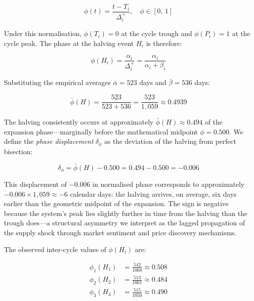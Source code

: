 \begin{equation}
  \phi(t) = \frac{t - T_i}{\Delta^{+}_i}, \quad \phi \in [0,\, 1]
  \label{eq:phase_norm}
\end{equation}

Under this normalisation, $\phi(T_i) = 0$ at the cycle trough and
$\phi(P_i) = 1$ at the cycle peak. The phase at the halving event $H_i$ is
therefore:

\begin{equation}
  \phi(H_i) = \frac{\alpha_i}{\Delta^{+}_i}
             = \frac{\alpha_i}{\alpha_i + \beta_i}
  \label{eq:phase_halving}
\end{equation}

Substituting the empirical averages $\bar{\alpha} = 523$ days and
$\bar{\beta} = 536$ days:

\begin{equation}
  \bar{\phi}(H) = \frac{523}{523 + 536}
                = \frac{523}{1{,}059}
                \approx 0.4939
  \label{eq:phase_halving_value}
\end{equation}

The halving consistently occurs at approximately $\bar{\phi}(H) \approx 0.494$
of the expansion phase---marginally before the mathematical midpoint
$\phi = 0.500$. We define the \textit{phase displacement} $\delta_\phi$ as the
deviation of the halving from perfect bisection:

\begin{equation}
  \delta_\phi = \bar{\phi}(H) - 0.500 = 0.494 - 0.500 = -0.006
  \label{eq:phase_displacement}
\end{equation}

This displacement of $-0.006$ in normalised phase corresponds to approximately
$-0.006 \times 1{,}059 \approx -6$ calendar days: the halving arrives,
on average, six days earlier than the geometric midpoint of the expansion. The
sign is negative because the system's peak lies slightly further in time from
the halving than the trough does---a structural asymmetry we interpret as the
lagged propagation of the supply shock through market sentiment and price
discovery mechanisms.

The observed inter-cycle values of $\phi(H_i)$ are:

\begin{align}
  \phi_1(H_1) &= \frac{542}{1068} \approx 0.508 \\[4pt]
  \phi_2(H_2) &= \frac{513}{1061} \approx 0.484 \\[4pt]
  \phi_3(H_3) &= \frac{515}{1050} \approx 0.490
\end{align}


